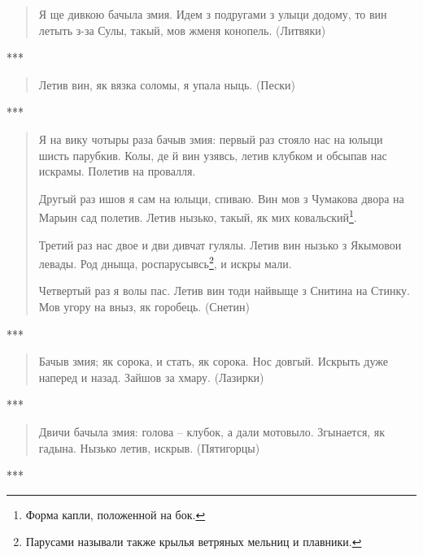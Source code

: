 \begin{quotation}
Я ще дивкою бачыла змия. Идем з подругами з улыци додому, то вин летыть з-за Сулы, такый, мов жменя конопель. (Литвяки)
\end{quotation}

\begin{center}
***\end{center}

\begin{quotation}
Летив вин, як вязка соломы, я упала ныць. (Пески)
\end{quotation}

\begin{center}
***\end{center}

\begin{quotation}
Я на вику чотыры раза бачыв змия: первый раз стояло нас на юлыци шисть парубкив. Колы, де й вин узявсь, летив клубком и обсыпав нас искрамы. Полетив на провалля. 

Другый раз ишов я сам на юлыци, спиваю. Вин мов з Чумакова двора на Марьин сад полетив. Летив нызько, такый, як мих ковальский\footnote{Форма капли, положенной на бок.}. 

Третий раз нас двое и дви дивчат гулялы. Летив вин нызько з Якымовои левады. Род дныща, роспарусывсь\footnote{Парусами называли также крылья ветряных мельниц и плавники.}, и искры мали. 

Четвертый раз я волы пас. Летив вин тоди найвыще з Снитина на Стинку. Мов угору на вныз, як горобець. (Снетин)
\end{quotation}

\begin{center}
***\end{center}

\begin{quotation}
Бачыв змия; як сорока, и стать, як сорока. Нос довгый. Искрыть дуже наперед и назад. Зайшов за хмару. (Лазирки)
\end{quotation}

\begin{center}
***\end{center}

\begin{quotation}
Двичи бачыла змия: голова – клубок, а дали мотовыло. Згынается, як гадына. Нызько летив, искрыв. (Пятигорцы)
\end{quotation}

\begin{center}
***\end{center}

